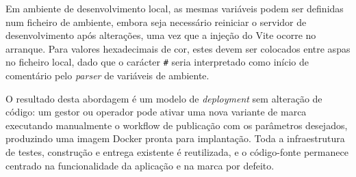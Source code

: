 Em ambiente de desenvolvimento local, as mesmas variáveis podem ser definidas num ficheiro de ambiente, embora seja necessário reiniciar o servidor de desenvolvimento após alterações, uma vez que a injeção do Vite ocorre no arranque. Para valores hexadecimais de cor, estes devem ser colocados entre aspas no ficheiro local, dado que o carácter \texttt{\#} seria interpretado como início de comentário pelo \textit{parser} de variáveis de ambiente.

O resultado desta abordagem é um modelo de \textit{deployment} sem alteração de código: um gestor ou operador pode ativar uma nova variante de marca executando manualmente o workflow de publicação com os parâmetros desejados, produzindo uma imagem Docker pronta para implantação. Toda a infraestrutura de testes, construção e entrega existente é reutilizada, e o código-fonte permanece centrado na funcionalidade da aplicação e na marca por defeito.
